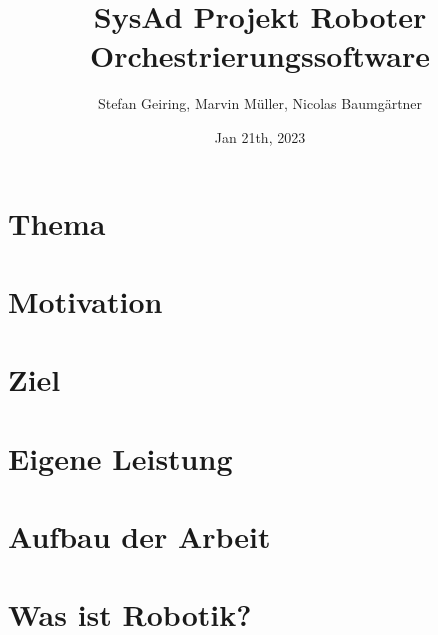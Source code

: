 \documentclass[11pt,oneside,a4paper,titlepage]{article}
\title{{SysAd Projekt Roboter Orchestrierungssoftware}}
\author{Stefan Geiring, Marvin Müller, Nicolas Baumgärtner}
\date{Jan 21th, 2023}
\begin{document}
\setlength{\parindent}{0pt}






\newpage

\pagestyle{fancy}


\tableofcontents

\fancyhead[RO,LE]{\nouppercase{\leftmark}}
\fancyfoot[RO,LE]{\thepage}

\renewcommand{\headrulewidth}{0.5pt}

\setcounter{page}{1}

\newpage



\section{Thema}


\section{Motivation}


\section{Ziel}


\section{Eigene Leistung}


\section{Aufbau der Arbeit}

\pagebreak

\section{Was ist Robotik?}

\end{document}
